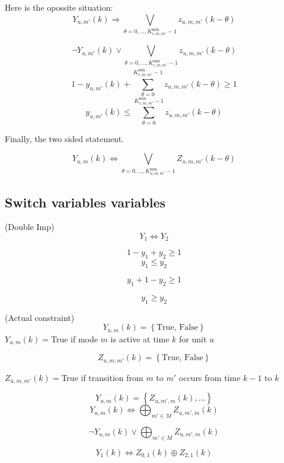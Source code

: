 \documentclass{tufte-handout}
\begin{document}
Here is the opossite situation:
\begin{equation}
    Y_{u, m'} \left( k \right) \Rightarrow \bigvee_{\theta = 0, \dots, K_{c,m,m'}^{\text{min}} -1} z_{u, m, m'}\left(k-\theta \right) 
\end{equation}

\[
    \neg 
    Y_{u, m'} \left( k \right) \vee  \bigvee_{\theta = 0, \dots, K_{c,m,m'}^{\text{min}} -1} z_{u, m, m'}\left(k-\theta \right) 
\]
\[
    1- y_{u, m'} \left( k \right) +  \sum_{\theta = 0}^{K_{c,m,m'}^{\text{min}} -1} z_{u, m, m'}\left(k-\theta \right) \geq 1
\]
\[
    y_{u, m'} \left( k \right) \leq  \sum_{\theta = 0}^{K_{c,m,m'}^{\text{min}} -1} z_{u, m, m'}\left(k-\theta \right)
\]

Finally, the two sided statement. 

\begin{equation}
    Y_{u, m} \left( k \right) \Leftrightarrow 
    \bigvee_{\theta=0, \dots, K^{\min}_{u, m, m'}-1} Z_{u, m, m'} \left(k - \theta \right)
\end{equation}

\subsection{Switch variables variables}
(Double Imp)
\[
Y_1 \Leftrightarrow Y_2
\]

\[
1-y_1 + y_2 \geq 1
\]
\[
y_1 \leq y_2
\]

\[
y_1 + 1 - y_2 \geq 1
\]

\[
y_1 \geq y_2
\]

(Actual constraint)
\[Y_{u, m} \left( k \right) = \left\{ \text{True, False} \right\}\]
\noindent $Y_{u, m} \left( k \right)=$True if mode $m$ is active at time $k$ for unit $u$  

\[
    Z_{u, m, m'}\left(k \right) = \left\{\text{True, False}\right\}
\]

\noindent $Z_{u, m, m'}\left(k \right)=$True if transition from $m$ to $m'$ occurs from time $k-1$ to $k$

\[
    Y_{u, m} \left( k \right) = \left\{Z_{u, m', m}\left(k\right),\dots  \right\}
\]
\[
    Y_{u, m} \left( k \right) \Leftrightarrow \bigoplus_{m' \in M} Z_{u, m', m}\left(k\right)
\]

\[
    \neg Y_{u, m} \left( k \right) \vee \bigoplus_{m' \in M} Z_{u, m', m} \left(k \right)
\]

\[
    Y_{1}\left(k\right) \Leftrightarrow   Z_{0, 1} \left( k \right) \oplus Z_{2, 1} \left( k \right)
\]
\end{document}

